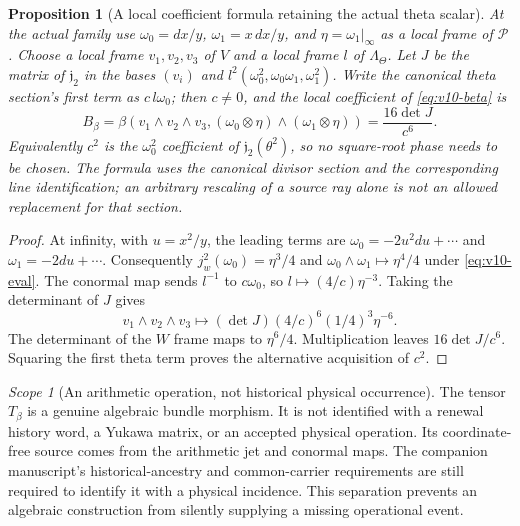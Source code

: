 \documentclass[11pt]{article}
\newtheorem{proposition}[proposition]{Proposition}
\theoremstyle{definition}
\theoremstyle{remark}
\newtheorem{scope}[scope]{Scope}
\begin{document}
\begin{proposition}[A local coefficient formula retaining the actual theta scalar]
\label{prop:v10-coefficient}
At the actual family use $\omega_0=dx/y$, $\omega_1=x\,dx/y$, and
$\eta=\omega_1|_\infty$ as a local frame of $\mathscr P$. Choose a
local frame $v_1,v_2,v_3$ of $V$ and a local frame $l$ of
$\Lambda_\Theta$. Let $J$ be the matrix of $\mathfrak j_2$ in the
bases $(v_i)$ and $l^2(\omega_0^2,\omega_0\omega_1,\omega_1^2)$.
Write the canonical theta section's first term as $c\,l\omega_0$;
then $c\ne0$, and the local coefficient of \cref{eq:v10-beta} is
\begin{equation}
 \boxed{B_\beta=
 \beta(v_1\wedge v_2\wedge v_3,
       (\omega_0\otimes\eta)\wedge(\omega_1\otimes\eta))
       =\frac{16\det J}{c^6}.}
 \label{eq:v10-beta-coefficient}
\end{equation}
Equivalently $c^2$ is the $\omega_0^2$ coefficient of
$\mathfrak j_2(\theta^2)$, so no square-root phase needs to be chosen.
The formula uses the canonical divisor section and the corresponding
line identification; an arbitrary rescaling of a source ray alone is not
an allowed replacement for that section.
\end{proposition}
\begin{proof}
At infinity, with $u=x^2/y$, the leading terms are
$\omega_0=-2u^2du+\cdots$ and $\omega_1=-2du+\cdots$.
Consequently $j^2_w(\omega_0)=\eta^3/4$ and
$\omega_0\wedge\omega_1\mapsto\eta^4/4$ under
\cref{eq:v10-eval}. The conormal map sends $l^{-1}$ to $c\omega_0$,
so $l\mapsto(4/c)\eta^{-3}$. Taking the determinant of $J$ gives
\[
 v_1\wedge v_2\wedge v_3
 \longmapsto(\det J)(4/c)^6(1/4)^3\eta^{-6}.
\]
The determinant of the $W$ frame maps to $\eta^6/4$. Multiplication
leaves $16\det J/c^6$. Squaring the first theta term proves the
alternative acquisition of $c^2$.
\end{proof}

\begin{scope}[An arithmetic operation, not historical physical occurrence]
The tensor $T_\beta$ is a genuine algebraic bundle morphism. It is not
identified with a renewal history word, a Yukawa matrix, or an accepted
physical operation. Its coordinate-free source comes from the arithmetic
jet and conormal maps. The companion manuscript's historical-ancestry and
common-carrier requirements are still required to identify it with a
physical incidence. This separation prevents an algebraic construction
from silently supplying a missing operational event.
\end{scope}
\end{document}
